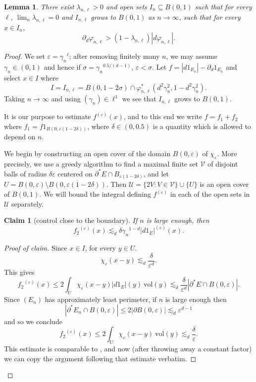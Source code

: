 \documentclass[reqno,12pt,letterpaper]{amsart}
\newcommand{\vol}{\mathrm{vol}}
\newtheorem{lemma}[theorem]{Lemma}
\newtheorem{claim}[theorem]{Claim}
\theoremstyle{definition}
\numberwithin{equation}{section}
\begin{document}
\begin{lemma}
There exist $\lambda_{n,\ell} > 0$ and open sets $I_n \subseteq B(0, 1)$ such that for every $\ell$, $\lim_n \lambda_{n,\ell} = 0$ and $I_{n, \ell}$ grows to $B(0, 1)$ as $n \to \infty$, such that for every $x \in I_n$,
$$\partial_d \varphi_{n,\ell} > (1 - \lambda_{n, \ell}) |d\varphi_{n,\ell}|.$$
\end{lemma}
\begin{proof}
We set $\varepsilon = {\gamma_n}^\ell$; after removing finitely many $n$, we may assume $\gamma_n \in (0, 1)$ and hence if $\sigma = {\gamma_n}^{0.5/(d - 1)}$, $\varepsilon < \sigma$.
Let $f = |d1_{E_n}| - \partial_d 1_{E_n}$ and select $x \in I$ where
$$I = I_{n, \ell} = B(0, 1 - 2\sigma) \cap \varphi_{n, \ell}^*(d^2 \gamma_n^2, 1 - d^2 \gamma_n^2).$$
Taking $n \to \infty$ and using $(\gamma_n) \in \ell^1$ we see that $I_{n, \ell}$ grows to $B(0, 1)$.

It is our purpose to estimate $f^{(\varepsilon)}(x)$, and to this end we write $f = f_1 + f_2$ where $f_1 = f1_{B(0, \varepsilon(1 - 2\delta))}$, where $\delta \in (0, 0.5)$ is a quantity which is allowed to depend on $n$.

We begin by constructing an open cover of the domain $B(0, \varepsilon)$ of $\chi_\varepsilon$.
More precisely, we use a greedy algorithm to find a maximal finite set $\mathcal V$ of disjoint balls of radius $\delta \varepsilon$ centered on $\partial^* E \cap B_{\varepsilon(1 - 2\delta)}$, and let $U = B(0, \varepsilon) \setminus \overline{B(0, \varepsilon(1 - 2\delta))}$.
Then $\mathcal U = \{2V: V \in \mathcal V\} \cup \{U\}$ is an open cover of $B(0, 1)$.
We will bound the integral defining $f^{(\varepsilon)}$ in each of the open sets in $\mathcal U$ separately.

\begin{claim}[control close to the boundary]\label{molly close}
If $n$ is large enough, then
$${f_2}^{(\varepsilon)}(x) \lesssim_d \delta {\gamma_n}^{1 - d} |d1_E|^{(\varepsilon)}(x).$$
\end{claim}
\begin{proof}[Proof of claim]
Since $x \in I$, for every $y \in U$.
$$\chi_\varepsilon(x - y) \lesssim_d \frac{\delta}{\varepsilon^d}.$$
This gives
$${f_2}^{(\varepsilon)}(x) \leq 2\int_U \chi_\varepsilon(x - y) |d1_E|(y) ~\vol(y) \lesssim_d \frac{\delta}{\varepsilon^d} |\partial^* E \cap B(0, \varepsilon)|.$$
Since $(E_n)$ has approximately least perimeter, if $n$ is large enough then
$$|\partial^* E_n \cap B(0, \varepsilon)| \leq 2|\partial B(0, \varepsilon)| \lesssim_d \varepsilon^{d - 1}$$
and so we conclude
$${f_2}^{(\varepsilon)}(x) \leq 2\int_U \chi_\varepsilon(x - y) ~\vol(y) \lesssim_d \frac{\delta}{\varepsilon}.$$
This estimate is comparable to \cite[(7.8)]{Giusti77}, and now (after throwing away a constant factor) we can copy the argument following that estimate verbatim.
\end{proof}


\end{proof}
\end{document}
